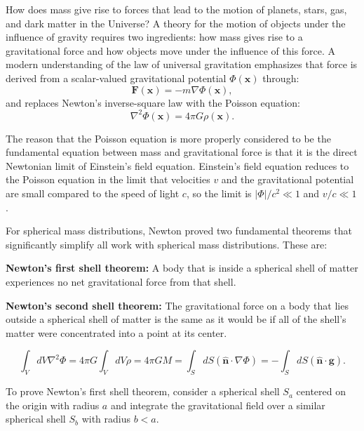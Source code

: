 How does mass give rise to forces that lead to the motion of planets, stars, gas, and dark matter in the Universe? A theory for the motion of objects under the influence of gravity requires two ingredients: how mass gives rise to a gravitational force and how objects move under the influence of this force. A modern understanding of the law of universal gravitation emphasizes that force is derived from a scalar-valued gravitational potential $\Phi(\bm{x})$ through:
\begin{equation}
    \bm{F}(\bm{x}) = -m \nabla\Phi(\bm{x}),
\end{equation}
and replaces Newton's inverse-square law with the Poisson equation:
\begin{equation}
    \nabla^2\Phi(\bm{x}) = 4\pi G\rho(\bm{x}).
\end{equation}

The reason that the Poisson equation is more properly considered to be the fundamental equation between mass and gravitational force is that it is the direct Newtonian limit of Einstein's field equation. Einstein's field equation reduces to the Poisson equation in the limit that velocities $v$ and the gravitational potential are small compared to the speed of light $c$, so the limit is $|\Phi|/c^2 \ll 1$ and $v/c \ll 1$.

For spherical mass distributions, Newton proved two fundamental theorems that significantly simplify all work with spherical mass distributions. These are:

\noindent \textbf{Newton's first shell theorem:} A body that is inside a spherical shell of matter experiences no net gravitational force from that shell.

\noindent \textbf{Newton's second shell theorem:} The gravitational force on a body that lies outside a spherical shell of matter is the same as it would be if all of the shell's matter were concentrated into a point at its center.

\begin{equation}
    \int_V dV \nabla^2 \Phi = 4 \pi G \int_V dV \rho = 4\pi G M = \int_S dS (\bm{\hat{n}} \cdot \nabla \Phi) = -\int_S dS (\bm{\hat{n}} \cdot \bm{g}).
\end{equation}

To prove Newton's first shell theorem, consider a spherical shell $S_a$ centered on the origin with radius $a$ and integrate the gravitational field over a similar spherical shell $S_b$ with radius $b < a$.